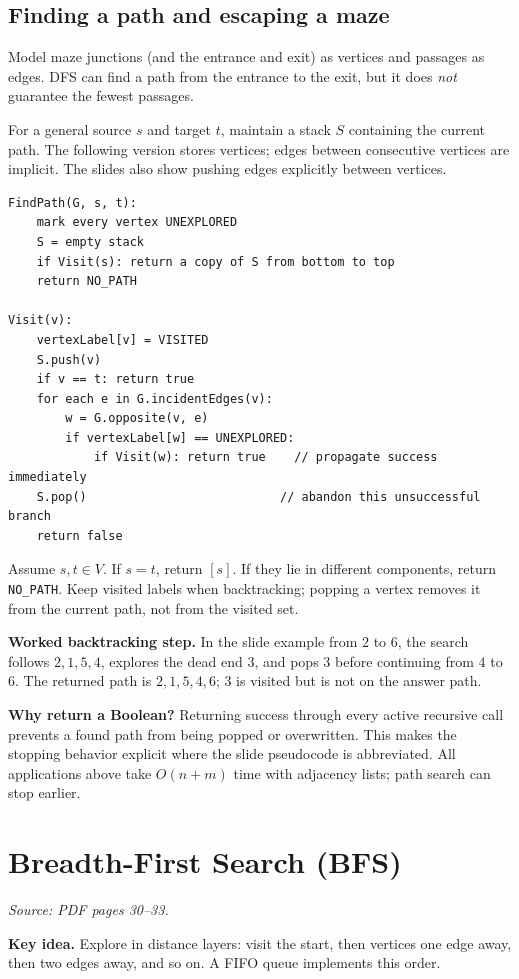 \documentclass[11pt,letterpaper]{article}
\newcommand{\sourcepages}[1]{\textit{Source: PDF pages #1.}}
\newcommand{\keyidea}[1]{\par\textbf{Key idea.} #1\par}
\newcommand{\method}[1]{\texttt{#1}}
\begin{document}
\subsection{Finding a path and escaping a maze}
Model maze junctions (and the entrance and exit) as vertices and passages as edges. DFS can find a path from the entrance to the exit, but it does \emph{not} guarantee the fewest passages.

For a general source $s$ and target $t$, maintain a stack $S$ containing the current path. The following version stores vertices; edges between consecutive vertices are implicit. The slides also show pushing edges explicitly between vertices.
\begin{lstlisting}
FindPath(G, s, t):
    mark every vertex UNEXPLORED
    S = empty stack
    if Visit(s): return a copy of S from bottom to top
    return NO_PATH

Visit(v):
    vertexLabel[v] = VISITED
    S.push(v)
    if v == t: return true
    for each e in G.incidentEdges(v):
        w = G.opposite(v, e)
        if vertexLabel[w] == UNEXPLORED:
            if Visit(w): return true    // propagate success immediately
    S.pop()                           // abandon this unsuccessful branch
    return false
\end{lstlisting}
Assume $s,t\in V$. If $s=t$, return $[s]$. If they lie in different components, return \method{NO\_PATH}. Keep visited labels when backtracking; popping a vertex removes it from the current path, not from the visited set.

\textbf{Worked backtracking step.} In the slide example from $2$ to $6$, the search follows $2,1,5,4$, explores the dead end $3$, and pops $3$ before continuing from $4$ to $6$. The returned path is $2,1,5,4,6$; $3$ is visited but is not on the answer path.

\textbf{Why return a Boolean?} Returning success through every active recursive call prevents a found path from being popped or overwritten. This makes the stopping behavior explicit where the slide pseudocode is abbreviated. All applications above take $O(n+m)$ time with adjacency lists; path search can stop earlier.

\clearpage
\section{Breadth-First Search (BFS)}
\sourcepages{30--33}

\keyidea{Explore in distance layers: visit the start, then vertices one edge away, then two edges away, and so on. A FIFO queue implements this order.}
\end{document}
